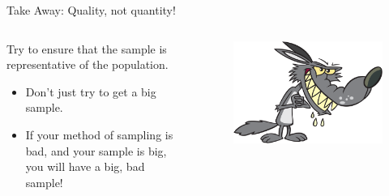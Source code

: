 \documentclass[aspectratio=169]{../latex_main/tntbeamer}  %
\begin{document}
	\begin{frame}{Take Away: Quality, not quantity!}
	     \begin{columns}
	        \begin{column}{.4\textwidth}
         
	            Try to ensure that the sample is representative of the population.
                   \begin{itemize}
                       \item Don’t just try to get a big sample.
                       \item If your method of sampling is bad, and your sample is big, you will have a big, bad sample!
                   \end{itemize}
                   \bigskip

	        \end{column}
	        \begin{column}{.4\textwidth}
	               \begin{figure}
	                   \centering
	                   \includegraphics[scale=.4]{Bild10}
	               \end{figure}
	        \end{column}
	        
	    \end{columns}
	\end{frame}
	
\end{document}
